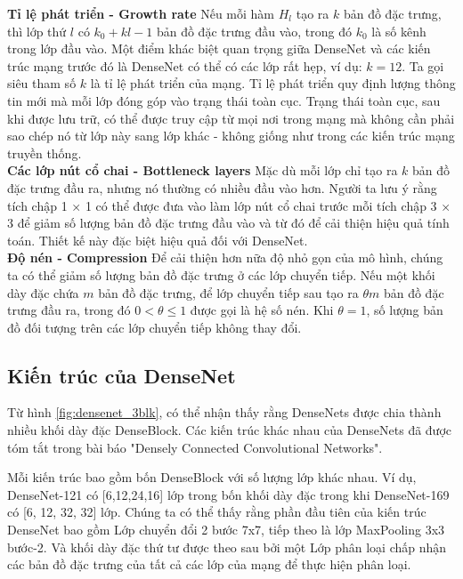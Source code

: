 {\bf Tỉ lệ phát triển - Growth rate}
Nếu mỗi hàm $H_l$ tạo ra $k$ bản đồ đặc trưng, thì lớp thứ $l$ có $k_0 + k{l-1}$ bản đồ đặc trưng đầu vào, trong đó $k_0$ là số kênh trong lớp đầu vào. Một điểm khác biệt quan trọng giữa DenseNet và các kiến trúc mạng trước đó là DenseNet có thể có các lớp rất hẹp, ví dụ: $k = 12$. Ta gọi siêu tham số $k$ là tỉ lệ phát triển của mạng. Tỉ lệ phát triển quy định lượng thông tin mới mà mỗi lớp đóng góp vào trạng thái toàn cục. Trạng thái toàn cục, sau khi được lưu trữ, có thể được truy cập từ mọi nơi trong mạng mà không cần phải sao chép nó từ lớp này sang lớp khác - không giống như trong các kiến trúc mạng truyền thống.\\
{\bf Các lớp nút cổ chai - Bottleneck layers}
Mặc dù mỗi lớp chỉ tạo ra $k$ bản đồ đặc trưng đầu ra, nhưng nó thường có nhiều đầu vào hơn. Người ta lưu ý rằng tích chập 1 × 1 có thể được đưa vào làm lớp nút cổ chai trước mỗi tích chập 3 × 3 để giảm số lượng bản đồ đặc trưng đầu vào và từ đó để cải thiện hiệu quả tính toán. Thiết kế này đặc biệt hiệu quả đối với DenseNet.\\
{\bf Độ nén - Compression}
Để cải thiện hơn nữa độ nhỏ gọn của mô hình, chúng ta có thể giảm số lượng bản đồ đặc trưng ở các lớp chuyển tiếp. Nếu một khối dày đặc chứa $m$ bản đồ đặc trưng, để lớp chuyển tiếp sau tạo ra $\theta m$ bản đồ đặc trưng đầu ra, trong đó $0 < \theta \leq 1$ được gọi là hệ số nén. Khi $\theta = 1$, số lượng bản đồ đối tượng trên các lớp chuyển tiếp không thay đổi.

\subsection{Kiến trúc của DenseNet}
Từ hình \ref{fig:densenet_3blk}, có thể nhận thấy rằng DenseNets được chia thành nhiều khối dày đặc DenseBlock. Các kiến trúc khác nhau của DenseNets đã được tóm tắt trong bài báo "Densely Connected Convolutional Networks"\cite{densenet}. 

Mỗi kiến trúc bao gồm bốn DenseBlock với số lượng lớp khác nhau. Ví dụ, DenseNet-121 có [6,12,24,16] lớp trong bốn khối dày đặc trong khi DenseNet-169 có [6, 12, 32, 32] lớp. Chúng ta có thể thấy rằng phần đầu tiên của kiến trúc DenseNet bao gồm Lớp chuyển đổi 2 bước 7x7, tiếp theo là lớp MaxPooling 3x3 bước-2. Và khối dày đặc thứ tư được theo sau bởi một Lớp phân loại chấp nhận các bản đồ đặc trưng của tất cả các lớp của mạng để thực hiện phân loại. 

